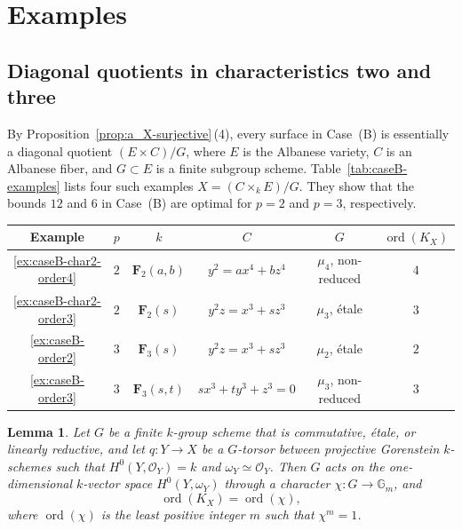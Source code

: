 \documentclass[10pt,abstract=true]{scrartcl}
\numberwithin{equation}{section}
\newtheorem{lemma}[theorem]{Lemma}
\theoremstyle{definition}
\theoremstyle{remark}
\DeclareMathOperator\ord{ord}
\begin{document}
\section{Examples}\label{sec:examples}
\subsection{Diagonal quotients in characteristics two and three}\label{sec:caseB-examples}%
By Proposition~\ref{prop:a_X-surjective}\,\textup{(4)}, every surface in Case~\textup{(B)} is essentially a diagonal quotient $(E\times C)/G$, where $E$ is the Albanese variety, $C$ is an Albanese fiber, and $G\subset E$ is a finite subgroup scheme. 
Table~\ref{tab:caseB-examples} lists four such examples $X=(C\times_kE)/G$.
They show that the bounds $12$ and $6$ in Case~\textup{(B)} are optimal for $p=2$ and $p=3$, respectively.

\par\medskip\noindent
\begin{minipage}{\linewidth}
  \centering
  \begin{tabular}{cccccc}
    \hline
    Example & $p$ & $k$ & $C$ & $G$ & $\ord(K_X)$\\
    \hline
    \ref{ex:caseB-char2-order4} & $2$ & $\mathbf F_2(a,b)$ & $y^2=ax^4+bz^4$ & $\mu_4$, non-reduced & $4$\\
    \ref{ex:caseB-char2-order3} & $2$ & $\mathbf F_2(s)$ & $y^2z=x^3+sz^3$ & $\mu_3$, \'{e}tale & $3$\\
    \ref{ex:caseB-order2} & $3$ & $\mathbf F_3(s)$ & $y^2z=x^3+sz^3$ & $\mu_2$, \'{e}tale & $2$\\
    \ref{ex:caseB-order3} & $3$ & $\mathbf F_3(s,t)$ & $sx^3+ty^3+z^3=0$ & $\mu_3$, non-reduced & $3$\\
    \hline
  \end{tabular}
  \label{tab:caseB-examples}
\end{minipage}
\par\medskip

\begin{lemma}\label{lem:canonical-character-descent}
  Let $G$ be a finite $k$-group scheme that is commutative, \'{e}tale, or linearly reductive, and let $q\colon Y\to X$ be a $G$-torsor between projective Gorenstein $k$-schemes such that $H^0(Y,\mathcal O_Y)=k$ and $\omega_Y\simeq\mathcal O_Y$.
  Then $G$ acts on the one-dimensional $k$-vector space $H^0(Y,\omega_Y)$ through a character $\chi\colon G\to\mathbb G_m$, and
  \[
    \ord(K_X)=\ord(\chi),
  \]
  where $\ord(\chi)$ is the least positive integer $m$ such that $\chi^m=1$.
\end{lemma}
\end{document}
